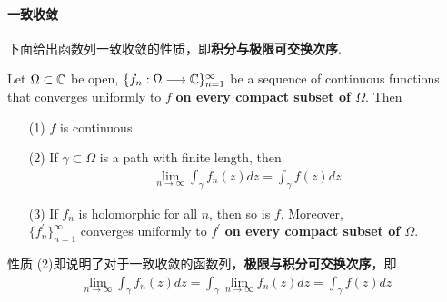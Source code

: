 \paragraph{一致收敛}
下面给出函数列一致收敛的性质，即\textbf{积分与极限可交换次序}.
\begin{thm}\label{thm 5.4.1}
	Let $\Omega \subset \mathbb{C}$ be open, $\{ f_n : \Omega \longrightarrow \mathbb{C} \}_{n = 1}^{\infty}$ be a sequence of continuous functions that converges uniformly to $f$ \textbf{on every compact subset of $\Omega$}. Then
	\begin{enumerate}
		\item[(1)]$f$ is continuous.
		
		\vspace{1em}
		
		\item[(2)]If $\gamma \subset \Omega$ is a path with finite length, then
		\begin{align}
			\lim_{n \to \infty}{\int_{\gamma}{f_{n}(z) dz}} = \int_{\gamma}{f(z) dz}
		\end{align}
		
		\vspace{1em}
		
		\item[(3)]If $f_n$ is holomorphic for all $n$, then so is $f$. Moreover, \\
		$\{ f_{n}^{'} \}_{n = 1}^{\infty}$ converges uniformly to $f^{'}$ \textbf{on every compact subset of $\Omega$}.
	\end{enumerate}
	
	\vspace{1em}
	\begin{rmk}
		性质 (2)即说明了对于一致收敛的函数列，\textbf{极限与积分可交换次序}，即
		\begin{align}
			\lim_{n \to \infty}{\int_{\gamma}{f_{n}(z) dz}} = \int_{\gamma}{\lim_{n \to \infty}{f_{n}(z) dz}} = \int_{\gamma}{f(z) dz}
		\end{align}
	\end{rmk}
	

\end{thm}
